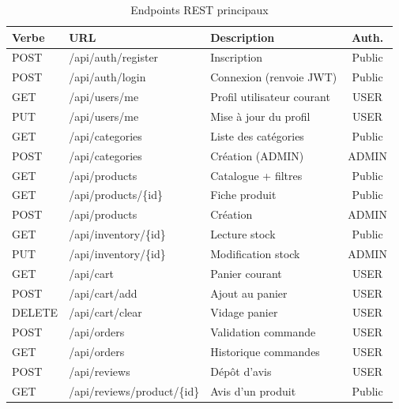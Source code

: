 \documentclass[11pt,a4paper,oneside]{report}
\begin{document}
\begin{table}[htbp]
\centering
\caption{Endpoints REST principaux}
\label{tab:endpoints}
\small
\begin{tabularx}{\textwidth}{p{1.2cm}p{4cm}Xc}
\toprule
\textbf{Verbe} & \textbf{URL} & \textbf{Description} & \textbf{Auth.}\\
\midrule
POST   & /api/auth/register     & Inscription                & Public\\
POST   & /api/auth/login        & Connexion (renvoie JWT)    & Public\\
GET    & /api/users/me          & Profil utilisateur courant & USER\\
PUT    & /api/users/me          & Mise à jour du profil      & USER\\
GET    & /api/categories        & Liste des catégories       & Public\\
POST   & /api/categories        & Création (ADMIN)           & ADMIN\\
GET    & /api/products          & Catalogue + filtres        & Public\\
GET    & /api/products/\{id\}   & Fiche produit              & Public\\
POST   & /api/products          & Création                   & ADMIN\\
GET    & /api/inventory/\{id\}  & Lecture stock              & Public\\
PUT    & /api/inventory/\{id\}  & Modification stock         & ADMIN\\
GET    & /api/cart              & Panier courant             & USER\\
POST   & /api/cart/add          & Ajout au panier            & USER\\
DELETE & /api/cart/clear        & Vidage panier              & USER\\
POST   & /api/orders            & Validation commande        & USER\\
GET    & /api/orders            & Historique commandes       & USER\\
POST   & /api/reviews           & Dépôt d'avis               & USER\\
GET    & /api/reviews/product/\{id\} & Avis d'un produit     & Public\\
\bottomrule
\end{tabularx}
\end{table}

\end{document}
